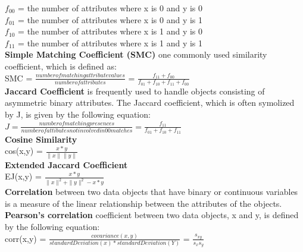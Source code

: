 		$f_{00}$ = the number of attributes where x is 0 and y is 0 \\
		$f_{01}$ = the number of attributes where x is 0 and y is 1 \\
		$f_{10}$ = the number of attributes where x is 1 and y is 0 \\
		$f_{11}$ = the number of attributes where x is 1 and y is 1 \\

	{\bf Simple Matching Coefficient (SMC)} one commonly used similarity coefficient, 
	which is defined as: \\

		SMC = $\frac{number of matching attribute values}{number of attributes}$ = 
		$\frac{f_{11} + f_{00}}{f_{01} + f_{10} + f_{11} + f_{00}}$
		\\


	{\bf Jaccard Coefficient} is frequently used to handle objects consisting of 
	asymmetric binary attributes. The Jaccard coefficient, which is often symolized by J, 
	is given by the following equation: \\

		$J = \frac{number of matching presences}{number of attibutes not involved in 00 matches} =
		\frac{f_{11}}{f_{01} + f_{10} + f_{11}}$
		\\

	{\bf Cosine Similarity} \\ 

		cos(x,y) = $\frac{x*y}{\|x\| \|y\|}$
		\\

	{\bf Extended Jaccard Coefficient} \\

		EJ(x,y) = $\frac{x*y}{\|x\|^{2} + \|y\|^{2} - x*y}$
		\\

	{\bf Correlation} between two data objects that have binary or continuous variables is a
	measure of the linear relationship between the attributes of the objects. 
	{\bf Pearson's correlation} coefficient between two data objects, x and y, is defined
	by the following equation: \\

		corr(x,y) = $\frac{covariance(x,y)}{standardDeviation(x)*standardDeviation(Y)}$ = 
		$\frac{s_{xy}}{s_{x}s_{y}}$


	



